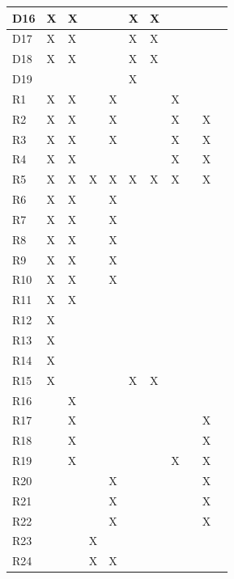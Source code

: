 \documentclass{article}
\begin{document}
\begin{longtable}[c]{|m{0.15cm}|m{0.15cm}|m{0.15cm}|m{0.15cm}|m{0.15cm}|m{0.15cm}|m{0.15cm}|m{0.15cm}|m{0.15cm}|m{0.15cm}|m{0.15cm}|}
 \hline
 D16 &X   & X  &   &   & X  & X  &   &   &      \\
 \hline
 D17 &X   & X  &   &   & X  & X  &   &   &      \\
 \hline
 D18 &X   & X  &   &   & X  & X  &   &   &      \\
 \hline
 D19 &   &   &   &   & X  &   &   &   &      \\
 \hline
 R1 & X & X &  & X  &  &   & X &   &    \\
 \hline
 R2 & X & X &  & X  &  &   & X &   &    X \\
 \hline
 R3 & X & X &  & X  &  &   & X &   &    X \\
 \hline
 R4 & X & X &  &  &  &   & X &   &    X \\
 \hline
 R5 & X & X  & X  & X  & X  & X  & X &   &    X \\
 \hline
 R6 & X & X  &   & X  &   &   &   &   &      \\
 \hline
 R7 & X & X  &   & X  &   &   &   &   &      \\
 \hline
 R8 & X & X  &   & X  &   &   &   &   &     \\
 \hline
 R9 &X   & X &   &  X &   &   &   &   &      \\
 \hline
 R10 &X   & X &  & X  &   &   &   &   &     \\
 \hline
 R11 &X   & X &  &   &   &   &   &   &      \\
 \hline
 R12 &X   &  &   &   &   &   &   &   &      \\
 \hline
 R13 &X   &  &   &   &   &   &   &   &      \\
 \hline
 R14 & X  &   &  &   &  &   &   &   &      \\
 \hline
 R15 & X  &   &  &   & X  & X  &   &   &      \\
 \hline
 R16 &   & X  &   &  &   &   &   &   &      \\
 \hline
 R17 &   & X  &   &  &  &   &   &   & X    \\
 \hline
 R18 &   & X  &   &  &   &   &   &   & X    \\
 \hline
 R19 &   & X  &   &   &   &   & X &   & X    \\
 \hline
 R20 &   &   &   & X  &   &   &   &   & X    \\
 \hline
 R21 &   &   &   & X  &   &   &   &   & X    \\
 \hline
 R22 &   &   &   & X  &   &   &   &   & X    \\
 \hline
 R23 &   &   & X  &   &  &   &   &   &      \\
 \hline
 R24 &   &   & X  & X  &  &   &   &   &      \\

\end{longtable}
\end{document}
